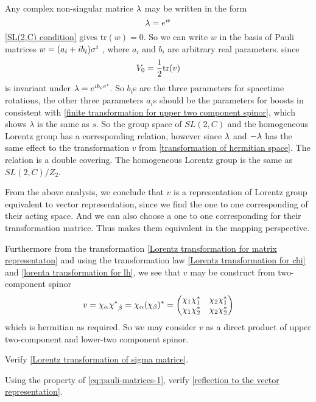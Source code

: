 Any complex non-singular matrice $\lambda$ may be written in the form
\begin{equation}
    \lambda = e^{w}
\end{equation}
 \eqref{SL(2,C) condition} gives $\text{tr}(w) = 0$. So we can write $w$ in the basis of Pauli matrices $w = (a_i+i b_i)\sigma^{i}$ , where $a_i$ and $b_i$ are arbitrary real parameters. since
\begin{equation}
    V_0 = \frac{1}{2}\text{tr}(v)
\end{equation}
is invariant under $\lambda = e^{i b_i\sigma^{i}}$. So $b_i$s are the three parameters for spacetime rotations, the other three parameters $a_i$s should be the parameters for boosts in consistent with \eqref{finite transformation for upper two component spinor}, which shows $\lambda$ is the same as $s$. So the group space of $SL(2,C)$ and the homogeneous Lorentz group has a corresponding relation, however since $\lambda$ and $-\lambda$ has the same effect to the transformation $v$ from \eqref{transformation of hermitian space}. The relation is a double covering. The homogeneous Lorentz group is the same as $SL(2,C)/Z_2$.

From the above analysis, we conclude that $v$ is a representation of Lorentz group equivalent to vector representation, since we find the one to one corresponding of their acting space. And we can also choose a one to one corresponding for their transformation matrice. Thus makes them equivalent in the mapping perspective.

Furthermore from the transformation \eqref{Lorentz transformation for matrix representaton} and using the transformation law \eqref{Lorentz transformation for chi} and \eqref{lorenta transformation for lh}, we see that $v$ may be construct from two-component spinor
\begin{equation}
  v = \chi_\a \lc_{\dob}=\chi_\a(\chi_{\be})^*
=\mqty(\chi_1\chi_1^* & \chi_2\chi_1^*
  \\\chi_1\chi_2^* & \chi_2\chi_2^*)
\end{equation}
which is hermitian as required. So we may consider $v$ as a direct product of upper two-component and lower-two component spinor.

\begin{Exe}\label{Exe:Lorentz transformation of sigma matrice}
	Verify \eqref{Lorentz transformation of sigma matrice}.
\end{Exe}

\begin{Exe}
Using the property of \eqref{eq:pauli-matrices-1}, verify \eqref{reflection to the vector representation}.
\end{Exe}




